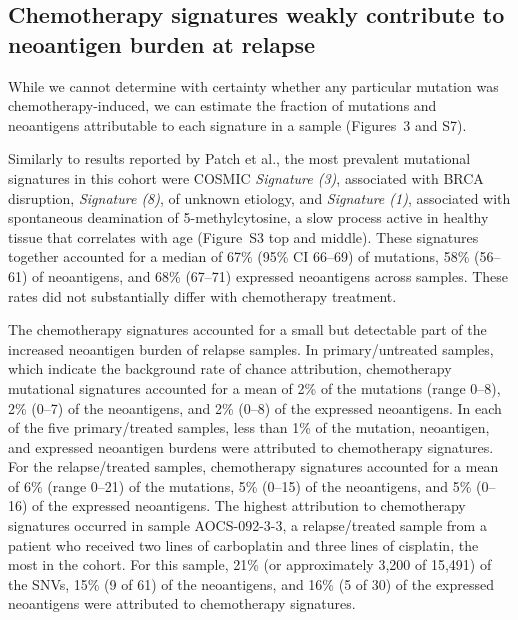 \documentclass[linenumbers]{bmcart}
\begin{document}
\subsection*{Chemotherapy signatures weakly contribute to neoantigen burden at relapse}


While we cannot determine with certainty whether any particular mutation was chemotherapy-induced, we can estimate the fraction of mutations and neoantigens attributable to each signature in a sample (Figures~3 and S7).

Similarly to results reported by Patch et al., the most prevalent mutational signatures in this cohort were COSMIC \textit{Signature (3)}, associated with BRCA disruption, \textit{Signature (8)}, of unknown etiology, and \textit{Signature (1)}, associated with spontaneous deamination of 5-methylcytosine, a slow process active in healthy tissue that correlates with age (Figure~S3 top and middle). These signatures together accounted for a median of 67\% (95\% CI 66--69) of mutations, 58\% (56--61) of neoantigens, and 68\% (67--71) expressed neoantigens across samples. These rates did not substantially differ with chemotherapy treatment.

The chemotherapy signatures accounted for a small but detectable part of the increased neoantigen burden of relapse samples. In primary/untreated samples, which indicate the background rate of chance attribution, chemotherapy mutational signatures accounted for a mean of 2\% of the mutations (range 0--8), 2\% (0--7) of the neoantigens, and 2\% (0--8) of the expressed neoantigens. In each of the five primary/treated samples, less than 1\% of the mutation, neoantigen, and expressed neoantigen burdens were attributed to chemotherapy signatures. For the relapse/treated samples, chemotherapy signatures accounted for a mean of 6\% (range 0--21) of the mutations, 5\% (0--15) of the neoantigens, and 5\% (0--16) of the expressed neoantigens. The highest attribution to chemotherapy signatures occurred in sample AOCS-092-3-3, a relapse/treated sample from a patient who received two lines of carboplatin and three lines of cisplatin, the most in the cohort. For this sample, 21\% (or approximately 3,200 of 15,491) of the SNVs, 15\% (9 of 61) of the neoantigens, and 16\% (5 of 30) of the expressed neoantigens were attributed to chemotherapy signatures.
\end{document}
